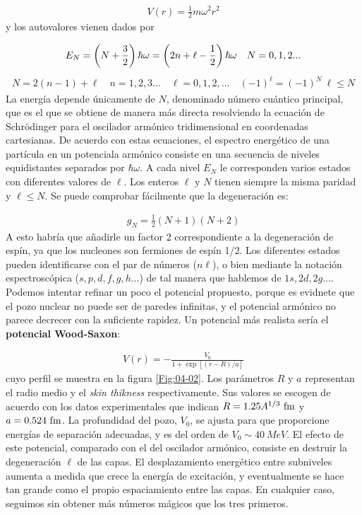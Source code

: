 \begin{eqnarray}
	V(r) = \frac{1}{2} m \omega^2 r^2
\end{eqnarray}
y los autovalores vienen dados por

\begin{eqnarray}
	E_N = \left( N+ \frac{3}{2} \right)\hbar \omega = \left( 2n + \ell - \frac{1}{2} \right) \hbar \omega \quad N=0,1,2...
\end{eqnarray}
\begin{eqnarray}
	N=2(n-1)+\ell \quad n=1,2,3\ldots \quad \ell = 0,1,2,\ldots \quad (-1)^{\ell} = (-1)^N \ \ell \leq N
\end{eqnarray}
La energía depende únicamente de $N$, denominado número cuántico principal, que es el que se obtiene de manera más directa resolviendo la ecuación de Schrödinger para el oscilador armónico tridimensional en coordenadas cartesianas. De acuerdo con estas ecuaciones, el espectro energético de una partícula en un potenciala armónico consiste en una secuencia de niveles equidistantes separados por $\hbar \omega$. A cada nivel $E_N$ le corresponden varios estados con diferentes valores de $\ell$. Los enteros $\ell$ y $N$ tienen siempre la misma paridad y $\ell \leq N$. Se puede comprobar fácilmente que la degeneración es:

\begin{eqnarray}
	g_N = \frac{1}{2}(N+1)(N+2)
\end{eqnarray}
A esto habría que añadirle un factor 2 correspondiente a la degeneración de espín, ya que los nucleones son fermiones de espín 1/2. Los diferentes estados pueden identificarse con el par de números ($n \ell$), o bien mediante la notación espectroscópica ($s,p,d,f,g,h\ldots$) de tal manera que hablemos de $1s,2d,2g\ldots$. \\


Podemos intentar refinar un poco el potencial propuesto, porque es evidnete que el pozo nuclear no puede ser de paredes infinitas, y el potencial armónico no parece decrecer con la suficiente rapidez. Un potencial más realista sería el \textbf{potencial Wood-Saxon}:

\begin{eqnarray}
	V(r) = - \frac{V_0}{1+\exp [(r-R)/a]}
\end{eqnarray}
cuyo perfil se muestra en la figura \ref{Fig:04-02}. Los parámetros $R$ y $a$ representan el radio medio y el \textit{skin thikness} respectivamente. Sus valores se escogen de acuerdo con los datos experimentales que indican $R=\num{1.25} A^{1/3} \ \unit{\fm}$ y  $a=0.524 \ \unit{\fm}$. La profundidad del pozo, $V_0$, se ajusta para que proporcione  energías de separación adecuadas, y es del orden de $V_0\sim 40 \ \unit{MeV}$. El efecto de este potencial, comparado con el del oscilador armónico, consiste en destruir la degeneración $\ell$ de las capas. El desplazamiento energético entre subniveles aumenta a medida que crece la energía de excitación, y eventualmente se hace tan grande como el propio espaciamiento entre las capas. En cualquier caso, seguimos sin obtener más números mágicos que los tres primeros. 


